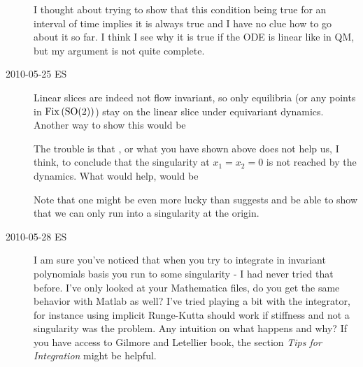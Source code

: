 \begin{description}
    I thought about trying to show that this condition being true for an interval of time implies it is always true and I have no clue how to go about it so far. I think I see why it is true if the ODE is linear like in QM, but my argument is not quite complete.


\item[2010-05-25 ES] Linear slices are indeed not flow invariant, so only equilibria (or any points in $\mathrm{Fix}\left(\textrm{SO}(2)\right)$) stay on the linear slice
under equivariant dynamics. Another way to show this would be


The trouble is that , or what you have shown above does not help us, I think, to conclude that the singularity at $x_1=x_2=0$ is not reached by the dynamics. What would help, would be


Note that one might be even more lucky than  suggests and be able to show that we can only run into a singularity at the origin.

\item[2010-05-28 ES] I am sure you've noticed that when you try to integrate in invariant polynomials basis
you run to some singularity - I had never tried that before. I've only looked at your Mathematica files,
do you get the same behavior with Matlab as well? I've tried playing a bit with the integrator,
for instance using implicit Runge-Kutta should work if stiffness and not a singularity was the problem.
Any intuition on what happens and why? If you have access to Gilmore and Letellier book,
the section \emph{Tips for Integration} might be helpful.


\end{description}
